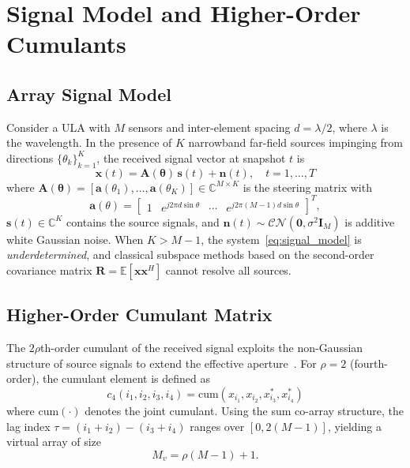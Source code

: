 \documentclass[journal]{IEEEtran}
\newcommand{\vect}[1]{\boldsymbol{#1}}
\newcommand{\mat}[1]{\mathbf{#1}}
\newcommand{\E}{\mathbb{E}}
\newcommand{\C}{\mathbb{C}}
\begin{document}
\section{Signal Model and Higher-Order Cumulants}
\label{sec:signal_model}

\subsection{Array Signal Model}

Consider a ULA with $M$ sensors and inter-element spacing $d = \lambda/2$, where $\lambda$ is the wavelength. In the presence of $K$ narrowband far-field sources impinging from directions $\{\theta_k\}_{k=1}^K$, the received signal vector at snapshot $t$ is
\begin{equation}
\mat{x}(t) = \mat{A}(\vect{\theta})\,\mat{s}(t) + \mat{n}(t), \quad t = 1, \ldots, T
\label{eq:signal_model}
\end{equation}
where $\mat{A}(\vect{\theta}) = [\mat{a}(\theta_1), \ldots, \mat{a}(\theta_K)] \in \C^{M \times K}$ is the steering matrix with
\begin{equation}
\mat{a}(\theta) = \begin{bmatrix} 1 & e^{j2\pi d\sin\theta} & \cdots & e^{j2\pi(M-1)d\sin\theta} \end{bmatrix}^T,
\end{equation}
$\mat{s}(t) \in \C^K$ contains the source signals, and $\mat{n}(t) \sim \mathcal{CN}(\mat{0}, \sigma^2\mat{I}_M)$ is additive white Gaussian noise. When $K > M-1$, the system~\eqref{eq:signal_model} is \emph{underdetermined}, and classical subspace methods based on the second-order covariance matrix $\mat{R} = \E[\mat{x}\mat{x}^H]$ cannot resolve all sources.

\subsection{Higher-Order Cumulant Matrix}

The $2\rho$th-order cumulant of the received signal exploits the non-Gaussian structure of source signals to extend the effective aperture~\cite{choi2015underdetermined,dogan1995cumulant}. For $\rho = 2$ (fourth-order), the cumulant element is defined as
\begin{equation}
c_4(i_1, i_2, i_3, i_4) = \mathrm{cum}(x_{i_1}, x_{i_2}, x^*_{i_3}, x^*_{i_4})
\end{equation}
where $\mathrm{cum}(\cdot)$ denotes the joint cumulant. Using the sum co-array structure, the lag index $\tau = (i_1 + i_2) - (i_3 + i_4)$ ranges over $[0, 2(M-1)]$, yielding a virtual array of size
\begin{equation}
M_v = \rho(M-1) + 1.
\label{eq:virtual_array}
\end{equation}
\end{document}
